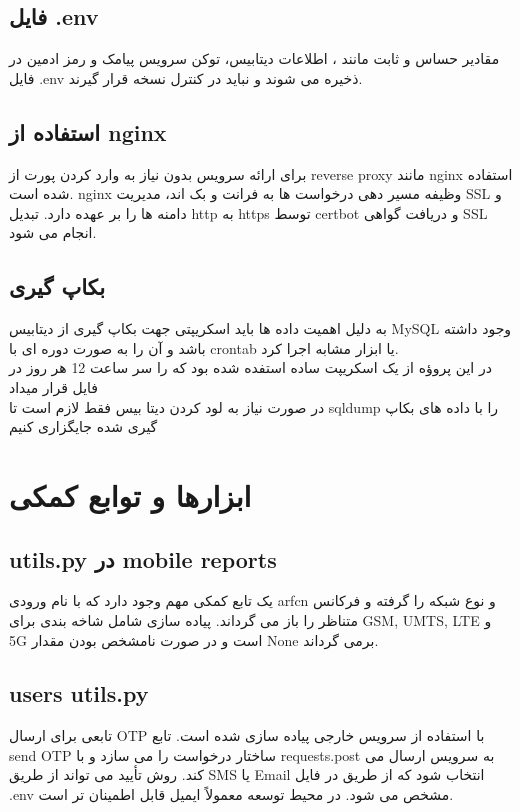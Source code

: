 \subsection{فایل .env}
مقادیر حساس و ثابت مانند ، اطلاعات دیتابیس، توکن سرویس پیامک و رمز ادمین در فایل .env ذخیره می شوند و نباید در کنترل نسخه قرار گیرند.

\subsection{استفاده از nginx}
برای ارائه سرویس بدون نیاز به وارد کردن پورت از reverse proxy مانند nginx استفاده شده است. nginx وظیفه مسیر دهی درخواست ها به فرانت و بک اند، مدیریت SSL و دامنه ها را بر عهده دارد. تبدیل http به https توسط certbot و دریافت گواهی SSL انجام می شود.

\subsection{بکاپ گیری}
به دلیل اهمیت داده ها باید اسکریپتی جهت بکاپ گیری از دیتابیس MySQL وجود داشته باشد و آن را به صورت دوره ای با crontab یا ابزار مشابه اجرا کرد.\\
در این پروؤه از یک اسکریپت ساده استفده شده بود که  را سر ساعت 12 هر روز در فایل قرار میداد
\\
در صورت نیاز به لود کردن دیتا بیس فقط لازم است تا sqldump را با داده های بکاپ گیری شده جایگزاری کنیم

\section{ابزارها و توابع کمکی}
\subsection{utils.py در mobile reports}
یک تابع کمکی مهم وجود دارد که با نام  ورودی arfcn و نوع شبکه را گرفته و فرکانس متناظر را باز می گرداند. پیاده سازی شامل شاخه بندی برای GSM, UMTS, LTE و 5G است و در صورت نامشخص بودن مقدار None برمی گرداند.

\subsection{users utils.py}
تابعی برای ارسال OTP با استفاده از سرویس خارجی پیاده سازی شده است. تابع send OTP ساختار درخواست را می سازد و با requests.post به سرویس ارسال می کند. روش تأیید می تواند از طریق SMS یا Email انتخاب شود که از طریق  در فایل .env مشخص می شود. در محیط توسعه معمولاً ایمیل قابل اطمینان تر است.

